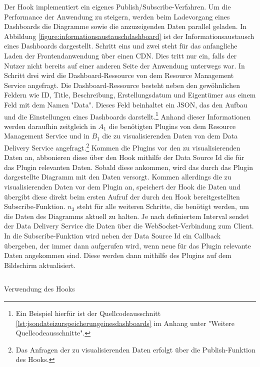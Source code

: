 Der  Hook implementiert ein eigenes Publish/Subscribe-Verfahren.
Um die Performance der Anwendung zu steigern, werden beim Ladevorgang eines Dashboards
die Diagramme sowie die anzuzeigenden Daten parallel geladen. In Abbildung \ref{figure:informationsaustauschdashboard}
ist der Informationsaustausch eines Dashboards dargestellt. Schritt eins und zwei steht
für das anfangliche Laden der Frontendanwendung über einen CDN. Dies tritt nur ein,
falls der Nutzer nicht bereits auf einer anderen Seite der Anwendung unterwegs war.
In Schritt drei wird die Dashboard-Ressource von dem Resource Management Service angefragt.
Die Dashboard-Ressource besteht neben den gewöhnlichen Feldern wie ID, Title, Beschreibung,
Erstellungsdatum und Eigentümer aus einem Feld mit dem Namen "Data". Dieses Feld beinhaltet
ein JSON, das den Aufbau und die Einstellungen eines Dashboards darstellt.\footnote{Ein
Beispiel hierfür ist der Quellcodeausschnitt \ref{lst:jsondateizurspeicherungeinesdashboards}
im Anhang unter "Weitere Quellcodeausschnitte".} Anhand dieser Informationen werden
daraufhin zeitgleich in \( A_1 \) die benötigten Plugins von dem Resource Management Service
und in \( B_1 \) die zu visualisierenden Daten von dem Data Delivery Service angefragt.\footnote{Das Anfragen der zu visualisierenden Daten erfolgt über die Publish-Funktion des 
 Hooks.}
Kommen die Plugins vor den zu visualisierenden Daten an, abbonieren diese über 
den  Hook mithilfe der Data Source Id die für das Plugin relevanten
Daten. Sobald diese ankommen, wird das durch das Plugin dargestellte Diagramm mit
den Daten versorgt. Kommen allerdings die zu visualisierenden Daten vor dem Plugin an,
speichert der  Hook die Daten und übergibt diese direkt beim
ersten Aufruf der durch den  Hook bereitgestellten
Subscribe-Funktion. \( n_3 \) steht für alle weiteren Schritte, die benötigt werden,
um die Daten des Diagramms aktuell zu halten. Je nach definiertem Interval sendet
der Data Delivery Service die Daten über die WebSocket-Verbindung zum Client.
In die Subscribe-Funktion wird neben der Data Source Id ein Callback übergeben,
der immer dann aufgerufen wird, wenn neue für das Plugin relevante Daten angekommen sind.
Diese werden dann mithilfe des Plugins auf dem Bildschirm aktualisiert.

\begin{listing}
    \inputminted{jsx}{snippets/jsx/useModalBeispiel.jsx}
    \caption{Verwendung des  Hooks}
    \label{lst:verwendungdesusemodalhooks}
\end{listing}

